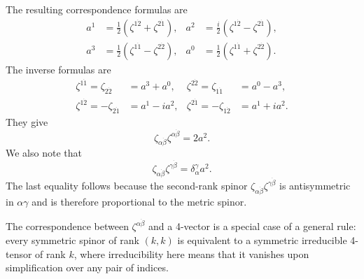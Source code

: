 The resulting correspondence formulas are
\begin{equation}
\begin{aligned}
a^1&=\frac12(\zeta^{1\dot2}+\zeta^{2\dot1}),
&a^2&=\frac{i}{2}(\zeta^{1\dot2}-\zeta^{2\dot1}),\\
a^3&=\frac12(\zeta^{1\dot1}-\zeta^{2\dot2}),
&a^0&=\frac12(\zeta^{1\dot1}+\zeta^{2\dot2}).
\end{aligned}
\tag{18.1}
\end{equation}
The inverse formulas are
\begin{equation}
\begin{aligned}
\zeta^{1\dot1}=\zeta_{2\dot2}&=a^3+a^0,
&\zeta^{2\dot2}=\zeta_{1\dot1}&=a^0-a^3,\\
\zeta^{1\dot2}=-\zeta_{2\dot1}&=a^1-ia^2,
&\zeta^{2\dot1}=-\zeta_{1\dot2}&=a^1+ia^2.
\end{aligned}
\tag{18.2}
\end{equation}
They give
\begin{equation}
\zeta_{\alpha\dot\beta}\zeta^{\alpha\dot\beta}=2a^2.
\tag{18.3}
\end{equation}
We also note that
\begin{equation}
\zeta_{\alpha\dot\beta}\zeta^{\gamma\dot\beta}=\delta_\alpha^\gamma a^2.
\tag{18.4}
\end{equation}
The last equality follows because the second-rank spinor $\zeta_{\alpha\dot\beta}\zeta^{\gamma\dot\beta}$ is antisymmetric in $\alpha\gamma$ and is therefore proportional to the metric spinor.

The correspondence between $\zeta^{\alpha\dot\beta}$ and a 4-vector is a special case of a general rule: every symmetric spinor of rank $(k,k)$ is equivalent to a symmetric irreducible 4-tensor of rank $k$, where irreducibility here means that it vanishes upon simplification over any pair of indices.

